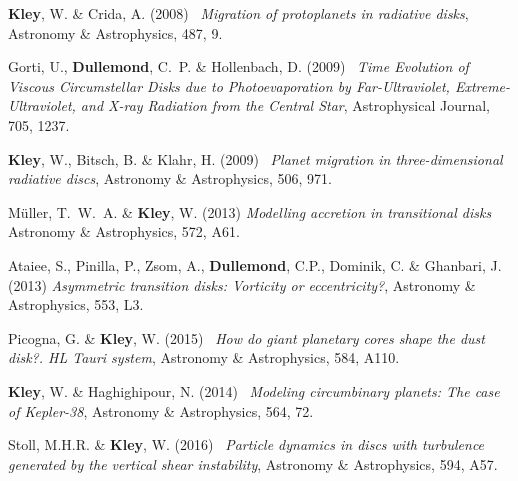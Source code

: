 \documentclass[10pt,fleqn,twoside]{article}
\begin{document}
\begin{literature}
\item
 {\bf Kley}, W. \& {Crida}, A. (2008) \, {\it Migration of protoplanets in radiative disks},
   Astronomy \& Astrophysics, 487, 9.
\item {Gorti}, U., {\bf Dullemond}, C.~P. \& {Hollenbach}, D. (2009) \,
  {\it Time Evolution of Viscous Circumstellar Disks due to Photoevaporation by Far-Ultraviolet, Extreme-Ultraviolet, and X-ray Radiation from the Central Star},
  Astrophysical Journal, 705, 1237.
\item
  {\bf Kley}, W., {Bitsch}, B. \& {Klahr}, H. (2009) \,
  {\it Planet migration in three-dimensional radiative discs},
  Astronomy \& Astrophysics, 506, 971.
\item
  {M{\"u}ller}, T.~W.~A. \& {\bf Kley}, W. (2013) {\it Modelling accretion in transitional disks}
   Astronomy \& Astrophysics, 572, A61.
\item
 {Ataiee}, S., {Pinilla}, P., {Zsom}, A., {\bf Dullemond}, C.P., {Dominik}, C. \& {Ghanbari}, J. (2013)
   {\it Asymmetric transition disks: Vorticity or eccentricity?},
   Astronomy \& Astrophysics, 553, L3.
\item
  {Picogna}, G. \& {\bf Kley}, W. (2015) \,
  {\it How do giant planetary cores shape the dust disk?. HL Tauri system},
  Astronomy \& Astrophysics, 584, A110.
\item
  {\bf Kley}, W. \& {Haghighipour}, N. (2014) \,
  {\it Modeling circumbinary planets: The case of Kepler-38},
  Astronomy \& Astrophysics, 564, 72.
\item
  {Stoll}, M.H.R. \& {\bf Kley}, W. (2016) \,
  {\it Particle dynamics in discs with turbulence generated by the vertical shear instability},
  Astronomy \& Astrophysics, 594, A57.
\end{literature}


% 
% 
% 
% 
\end{document}
